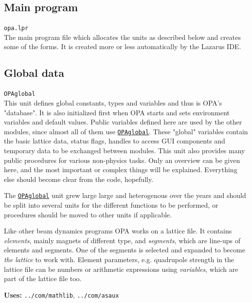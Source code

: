 \documentclass[12pt]{article}
\newcommand\code[1]{{\tt #1}}
\newcommand{\opauni}[1]{\colorbox{orange!30}{\code{#1}}}
\newcommand{\ounih}[2]{\subsection{\label{#2}#1}{\Huge\opauni{#2}}\\}
\newcommand{\ouni}[1]{\hyperref[#1]{\opauni{#1}}}
\newcommand{\uses}[1]{{\bf Uses: } #1}
\newcommand{\desc}[1]{#1}
\newcommand{\todo}[1]{{\color{red} #1}}
\begin{document}
\ounih{Main program}{{opa.lpr}}

\desc{The main program file which allocates the units as described below and creates some of the forms. It is created more or less automatically by the Lazarus IDE.}


\ounih{Global data}{OPAglobal}

\desc{
This unit defines global constants, types and variables and thus is OPA's "database". It is also initialized first when OPA starts and sets environment variables and default values. Public variables defined here are used by the other modules, since almost all of them use \ouni{OPAglobal}. These "global" variables contain the basic lattice data, status flags, handles to access GUI components and temporary data to be exchanged between modules. This unit also provides many public procedures for various non-physics tasks. Only an overview can be given here, and the most important or complex things will be explained. Everything else should become clear from the code, hopefully.

\todo{The \ouni{OPAglobal} unit grew large large and heterogenous over the years and should be split into several units for the different functions to be performed, or procedures should be moved to other units if applicable.}

Like other beam dynamics programs OPA works on a lattice file. It contains {\em elements}, mainly magnets of different type, and {\em segments}, which are line-ups of elements and segments. One of the segments is selected and expanded to become {\em the lattice} to work with. Element parameters, e.g. quadrupole strength in the lattice file can be numbers or arithmetic expressions using {\em variables}, which are part of the lattice file too.
}

\uses{\opauni{../com/mathlib}, \opauni{../com/asaux}}
\end{document}
